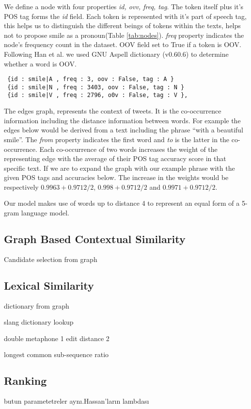 We define a node with four properties \textit{id, ovv, freq, tag}. The token itself plus it's POS tag forms the \textit{id} field. Each token is represented with it's part of speech tag, this helps us to distinguish the different beings of tokens within the texts, helps not to propose smile as a pronoun(Table \ref{tab:nodes}). \textit{freq} property indicates the node's frequency count in the dataset. OOV field set to True if a token is OOV. Following Han et al. we used GNU Aspell dictionary (v0.60.6) to determine whether a word is OOV.

\begin{table}[hbt]
  \centering
\begin{verbatim}
 {id : smile|A , freq : 3, oov : False, tag : A }
 {id : smile|N , freq : 3403, oov : False, tag : N }
 {id : smile|V , freq : 2796, o0v : False, tag : V },
\end{verbatim}
  \caption{Example nodes including token smile with a frequency greater than 0}
\label{tab:nodes}
\end{table}

The edges graph, represents the context of tweets. It is the co-occurrence information including the distance information between words. For example the edges below would be derived from a text including the phrase ``with a beautiful smile''. The \textit{from} property indicates the first word and \textit{to} is the latter in the co-occurrence. Each co-occurrence of two words increases the weight of the representing edge with the average of their POS tag accuracy score in that specific text. If we are to expand the graph with our example phrase with the given POS tags and accuracies below. The increase in the weights would be respectively $0.9963+0.9712/2$, $0.998+0.9712/2$ and $0.9971+0.9712/2$.

Our model makes use of words up to distance 4 to represent an equal form of a 5-gram language model.


\subsection{Graph Based Contextual Similarity}


Candidate selection from graph

\subsection{Lexical Similarity}

dictionary from graph

slang dictionary lookup

double metaphone 1
edit distance 2


longest common sub-sequence ratio



\subsection{Ranking}

butun parametetreler aynı.Hassan'ların lambdası
